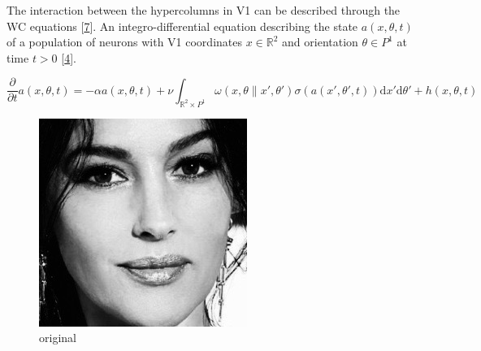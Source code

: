 \documentclass[american,]{article}
\theoremstyle{definition}
\theoremstyle{definition}
\theoremstyle{definition}
\theoremstyle{remark}
\begin{document}
The interaction between the hypercolumns in V1 can be described through
the WC equations {[}\protect\hyperlink{ref-bressloff2002}{7}{]}.
An integro-differential equation describing the state \(a(x,\theta,t)\) of a population
of neurons with V1 coordinates \(x\in\mathbb{R}^2\) and orientation \(\theta\in P^1\) at time \(t>0\) {[}\protect\hyperlink{ref-bertalmio2018}{4}{]}.

\begin{equation}
\frac{\partial}{\partial t}a(x,\theta,t) = -\alpha a(x,\theta,t) + \nu
\int_{\mathbb{R}^2\times P^1} \omega(x,\theta\| x',\theta') \sigma(a(x',\theta',t)) \mathrm{d}x'\mathrm{d}\theta'
+ h(x,\theta,t)
\end{equation}

\begin{figure}[H]
    \centering
    \begin{minipage}{0.3\linewidth}
        \centering
        \includegraphics[width=\textwidth]{img/img_original.jpg}\\original
    \end{minipage}\hfill%
    \begin{minipage}{0.3\linewidth}
        \centering

\end{minipage}
\end{figure}
\end{document}
